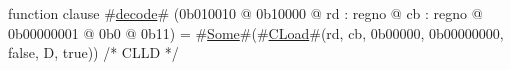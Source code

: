 function clause #\hyperref[zdecode]{decode}# (0b010010 @ 0b10000 @ rd : regno @ cb : regno @ 0b00000001 @ 0b0 @ 0b11) = #\hyperref[zSome]{Some}#(#\hyperref[zCLoad]{CLoad}#(rd, cb, 0b00000, 0b00000000, false, D, true)) /* CLLD  */
